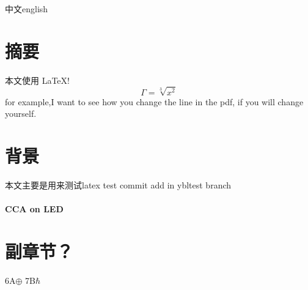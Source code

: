 \documentclass{article}
\begin{document}
	中文english
	\section{摘要}
	本文使用 \LaTeX!  $$ \Gamma=\sqrt[3]{x^2} $$
	for example,I want to see how you change the line in the pdf, if you will change yourself.
	\section{背景}
	本文主要是用来测试latex
	test commit
	add in ybltest branch
	\paragraph{CCA on LED}\section*{副章节？}
	6A$\oplus$ 7B$\hbar$
\end{document}
